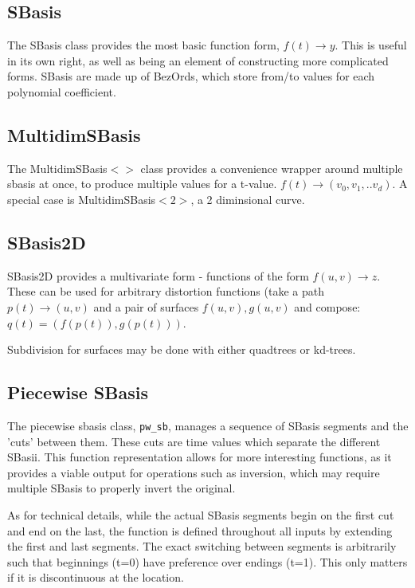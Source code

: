 \documentclass[openany]{book}
\newcommand{\code}[1]{\textsf{#1}}
\begin{document}
\subsection{SBasis}
The \code{SBasis} class provides the most basic function form,
$f(t) \rightarrow y$.  This is useful in its own right, as well as being an
element of constructing more complicated forms.  \code{SBasis} are made
up of \code{BezOrd}s, which store from/to values for each polynomial
coefficient.

\subsection{MultidimSBasis}
The \code{MultidimSBasis$<>$} class provides a convenience wrapper
around multiple sbasis at once, to produce multiple values for a t-value.
$f(t) \rightarrow (v_0, v_1, .. v_d)$.  A special case is \code{MultidimSBasis$<2>$},
a 2 diminsional curve.

\subsection{SBasis2D}
SBasis2D provides a multivariate form - functions of the form
$f(u,v) \rightarrow z$.  These can be used for arbitrary distortion
functions (take a path $p(t) \rightarrow (u,v)$ and a pair of surfaces
$f(u,v),g(u,v)$ and compose: $q(t) = (f(p(t)), g(p(t)))$.

Subdivision for surfaces may be done with either quadtrees or kd-trees.

\subsection{Piecewise SBasis}
The piecewise sbasis class, \verb#pw_sb#, manages a sequence of SBasis
segments and the 'cuts' between them.  These cuts are time values which
separate the different SBasii.  This function representation allows for
more interesting functions, as it provides a viable output for operations
such as inversion, which may require multiple SBasis to properly invert
the original.

As for technical details, while the actual SBasis segments begin on the
first cut and end on the last, the function is defined throughout all
inputs by extending the first and last segments.  The exact switching
between segments is arbitrarily such that beginnings (t=0) have
preference over endings (t=1).  This only matters if it is discontinuous
at the location.
\end{document}
